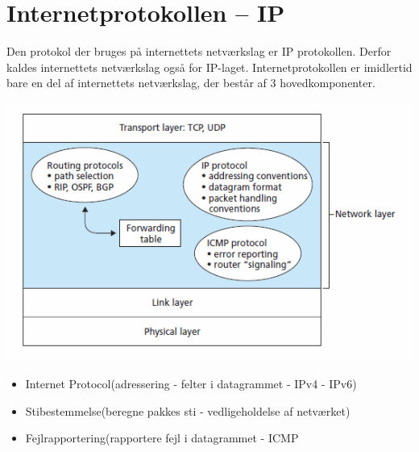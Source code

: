 {{{{\section{Internetprotokollen – IP}
Den protokol der bruges på internettets netværkslag er IP protokollen. 
Derfor kaldes internettets netværkslag også for IP-laget. Internetprotokollen er imidlertid bare en del af internettets netværkslag, der består af 3 hovedkomponenter.
\begin{center}
  \includegraphics{4-network-layer/networklayer.png}
\end{center}
\begin{itemize}
	\item Internet Protocol(adressering - felter i datagrammet - IPv4 - IPv6)
	\item Stibestemmelse(beregne pakkes sti - vedligeholdelse af netværket)
	\item Fejlrapportering(rapportere  fejl i datagrammet - ICMP
\end{itemize}

}}}}
